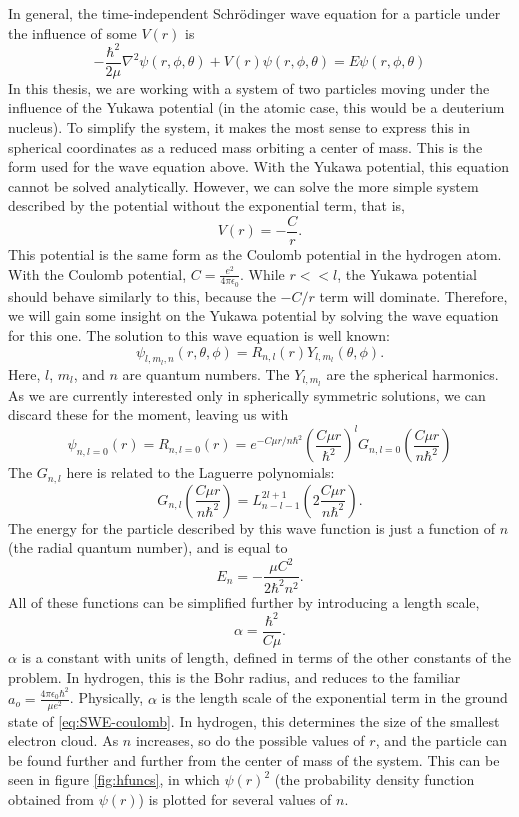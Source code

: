 \documentclass[12pt,twoside]{reedthesis}
\newcommand{\eqn}[1]{\begin{equation}#1\end{equation}}
\begin{document}
In general, the time-independent Schr\"odinger wave equation for a particle under the influence of some $V(r)$ is
\eqn{
-\frac{\hbar^2}{2\mu}\nabla^2\psi(r,\phi,\theta) + V(r)\psi (r,\phi,\theta) = E \psi(r,\phi,\theta)
\label{eq:TIDSWE-general}
}
In this thesis, we are working with a system of two particles moving under the influence of the Yukawa potential (in the atomic case, this would be a deuterium nucleus). To simplify the system, it makes the most sense to express this in spherical coordinates as a reduced mass orbiting a center of mass. This is the form used for the wave equation above. With the Yukawa potential, this equation cannot be solved analytically. However, we can solve the more simple system described by the potential without the exponential term, that is,
\eqn{
 V(r) = -\frac{C}{r}\mbox{.}
 }
This potential is the same form as the Coulomb potential in the hydrogen atom. With the Coulomb potential, $C = \frac{e^2}{4\pi \epsilon_0}$. While $r << l$, the Yukawa potential should behave similarly to this, because the $-C/r$ term will dominate. Therefore, we will gain some insight on the Yukawa potential by solving the wave equation for this one.
The solution to this wave equation is well known:
\eqn{
\psi_{l, m_l, n} (r, \theta, \phi) = R_{n,l}(r) Y_{l,m_l}(\theta,\phi)\mbox{.}
}
Here, $l$, $m_l$, and $n$ are quantum numbers. The $Y_{l, m_l}$ are the spherical harmonics. As we are currently interested only in spherically symmetric solutions, we can discard these for the moment, leaving us with
\eqn{
\psi_{n, l =0}(r) = R_{n , l= 0}(r) = e^{-C \mu r / n \hbar^2}\left(\frac{C \mu r}{\hbar^2}\right)^{l} G_{n, l = 0}\left(\frac{C \mu r}{n \hbar^2}\right)
\label{eq:SWE-coulomb}
}
The $G_{n,l}$ here is related to the Laguerre polynomials:
\eqn{
G_{n,l}\left(\frac{C \mu r}{n \hbar^2}\right) = L^{2l + 1 }_{n- l -1} \left(2\frac{C \mu r}{n \hbar^2}\right)\mbox{.}
}
The energy for the particle described by this wave function is just a function of $n$ (the radial quantum number), and is equal to
\eqn{
E_n = -\frac{\mu C^2}{2\hbar^2 n^2}\mbox{.}
}
All of these functions can be simplified further by introducing a length scale, 
\eqn{
\alpha = \frac{\hbar^2}{C \mu}\mbox{.}
\label{eq:bohrradius}
}
$\alpha$ is a constant with units of length, defined in terms of the other constants of the problem. In hydrogen, this is the Bohr radius, and reduces to the familiar $a_o = \frac{4\pi \epsilon_0 \hbar^2}{\mu e^2}$. Physically, $\alpha$ is the length scale of the exponential term in the ground state of \eqref{eq:SWE-coulomb}. In hydrogen, this determines the size of the smallest electron cloud. As $n$ increases, so do the possible values of $r$, and the particle can be found further and further from the center of mass of the system. This can be seen in figure \ref{fig:hfuncs}, in which $\psi(r)^2$ (the probability density function obtained from $\psi(r)$) is plotted for several values of $n$.
\end{document}
